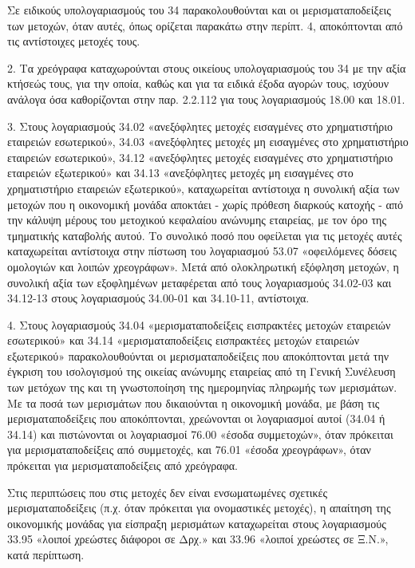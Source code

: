 \documentclass[A4,10pt,greek]{book}
\begin{document}
Σε ειδικούς υπολογαριασμούς του 34 παρακολουθούνται και οι μερισματαποδείξεις των μετοχών, όταν αυτές, όπως ορίζεται παρακάτω στην περίπτ. 4, αποκόπτονται από τις αντίστοιχες μετοχές τους.

2. Τα χρεόγραφα καταχωρούνται στους οικείους υπολογαριασμούς του 34 με την αξία κτήσεώς τους, για την οποία, καθώς και για τα ειδικά έξοδα αγορών τους, ισχύουν ανάλογα όσα καθορίζονται στην παρ. 2.2.112 για τους λογαριασμούς 18.00 και 18.01.

3. Στους λογαριασμούς 34.02 «ανεξόφλητες μετοχές εισαγμένες στο χρηματιστήριο εταιρειών εσωτερικού», 34.03 «ανεξόφλητες μετοχές μη εισαγμένες στο χρηματιστήριο εταιρειών εσωτερικού», 34.12 «ανεξόφλητες μετοχές εισαγμένες στο χρηματιστήριο εταιρειών εξωτερικού» και 34.13 «ανεξόφλητες μετοχές μη εισαγμένες στο χρηματιστήριο εταιρειών εξωτερικού», καταχωρείται αντίστοιχα η συνολική αξία των μετοχών που η οικονομική μονάδα αποκτάει - χωρίς πρόθεση διαρκούς κατοχής - από την κάλυψη μέρους του μετοχικού κεφαλαίου ανώνυμης εταιρείας, με τον όρο της τμηματικής καταβολής αυτού. Το συνολικό ποσό που οφείλεται για τις μετοχές αυτές καταχωρείται αντίστοιχα στην πίστωση του λογαριασμού 53.07 «οφειλόμενες δόσεις ομολογιών και λοιπών χρεογράφων». Μετά από ολοκληρωτική εξόφληση μετοχών, η συνολική αξία των εξοφλημένων μεταφέρεται από τους λογαριασμούς 34.02-03 και 34.12-13 στους λογαριασμούς 34.00-01 και 34.10-11, αντίστοιχα.

4. Στους λογαριασμούς 34.04 «μερισματαποδείξεις εισπρακτέες μετοχών εταιρειών εσωτερικού» και 34.14 «μερισματαποδείξεις εισπρακτέες μετοχών εταιρειών εξωτερικού» παρακολουθούνται οι μερισματαποδείξεις που αποκόπτονται μετά την έγκριση του ισολογισμού της οικείας ανώνυμης εταιρείας από τη Γενική Συνέλευση των μετόχων της και τη γνωστοποίηση της ημερομηνίας πληρωμής των μερισμάτων. Με τα ποσά των μερισμάτων που δικαιούνται η οικονομική μονάδα, με βάση τις μερισματαποδείξεις που αποκόπτονται, χρεώνονται οι λογαριασμοί αυτοί (34.04 ή 34.14) και πιστώνονται οι λογαριασμοί 76.00 «έσοδα συμμετοχών», όταν πρόκειται για μερισματαποδείξεις από συμμετοχές, και 76.01 «έσοδα χρεογράφων», όταν πρόκειται για μερισματαποδείξεις από χρεόγραφα.

Στις περιπτώσεις που στις μετοχές δεν είναι ενσωματωμένες σχετικές μερισματαποδείξεις (π.χ. όταν πρόκειται για ονομαστικές μετοχές), η απαίτηση της οικονομικής μονάδας για είσπραξη μερισμάτων καταχωρείται στους λογαριασμούς 33.95 «λοιποί χρεώστες διάφοροι σε Δρχ.» και 33.96 «λοιποί χρεώστες σε Ξ.Ν.», κατά περίπτωση.
\end{document}
